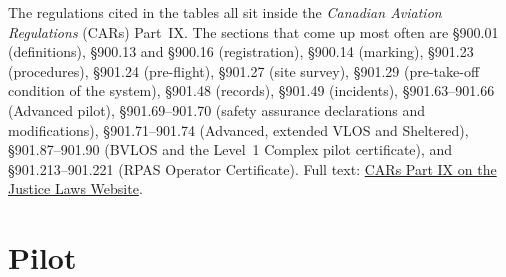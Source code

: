 \documentclass[11pt,letterpaper]{article}
\begin{document}
The regulations cited in the tables all sit inside the
\emph{Canadian Aviation Regulations} (CARs) Part~IX. The sections that
come up most often are \S900.01 (definitions), \S900.13 and \S900.16
(registration), \S900.14 (marking), \S901.23 (procedures), \S901.24
(pre-flight), \S901.27 (site survey), \S901.29 (pre-take-off condition
of the system), \S901.48 (records), \S901.49 (incidents),
\S901.63--901.66 (Advanced pilot), \S901.69--901.70 (safety assurance
declarations and modifications), \S901.71--901.74 (Advanced, extended
VLOS and Sheltered), \S901.87--901.90 (BVLOS and the Level~1 Complex
pilot certificate), and \S901.213--901.221 (RPAS Operator Certificate).
Full text:
\href{https://laws-lois.justice.gc.ca/eng/regulations/sor-96-433/section-900.01.html}{CARs Part IX on the Justice Laws Website}.

\tableofcontents
\newpage

\section{Pilot}
\end{document}
